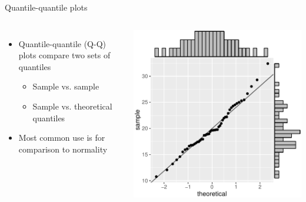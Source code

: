 \documentclass[10pt]{beamer}\usepackage[]{graphicx}\usepackage[]{color}
\begin{document}
\begin{frame}[fragile]{Quantile-quantile plots}

\begin{columns}[T,onlytextwidth]
    
\begin{itemize}
\item Quantile-quantile (Q-Q) plots compare two sets of quantiles
	\begin{itemize}
	\item Sample vs. sample
	\item Sample vs. theoretical quantiles
  \end{itemize}

\item Most common use is for comparison to normality
\end{itemize}

\vspace{-1cm}
\hspace{1pc}
  \includegraphics[width=1.05\linewidth]{figs/qqplot1.pdf}

\end{columns}
\end{frame}
\end{document}
